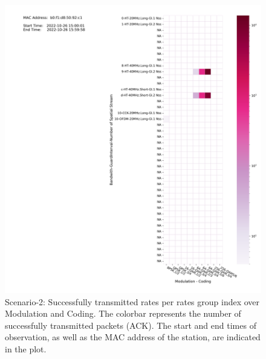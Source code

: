 \begin{figure}[hbt!]
  \centering
  \includegraphics[width=\textwidth]{figures/plots/Scenario-2/G2-heatmap-b0:f1:d8:50:92:c1-22-431070-450182.png}
  \caption[Rate-Based Packet Success Analysis]{Scenario-2: Successfully transmitted rates per rates group index over Modulation and Coding. The colorbar represents the number of successfully transmitted packets (ACK). The start and end times of observation, as well as the MAC address of the station, are indicated in the plot.}
  \label{fig:Success-count2}
\end{figure}
\FloatBarrier 


